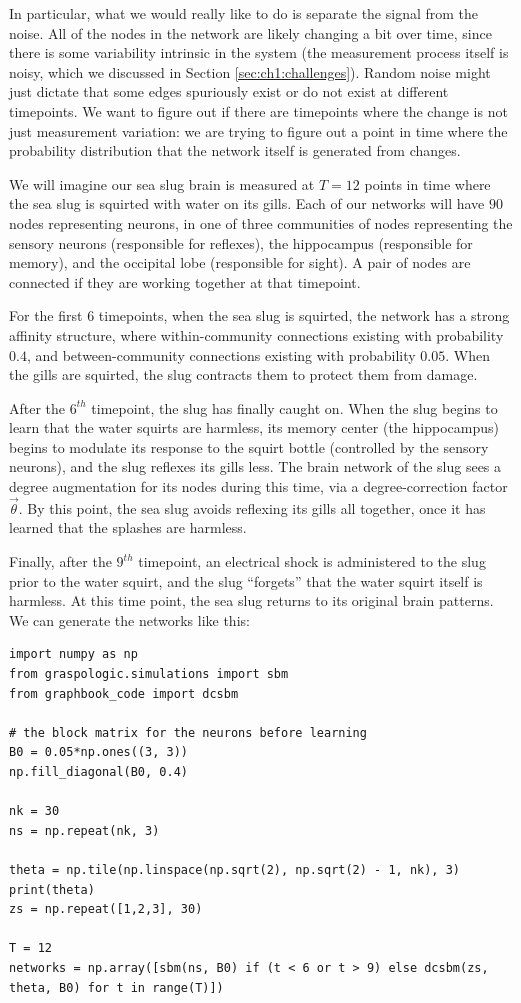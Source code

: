 In particular, what we would really like to do is separate the signal from the noise. All of the nodes in the network are likely changing a bit over time, since there is some variability intrinsic in the system (the measurement process itself is noisy, which we discussed in Section \ref{sec:ch1:challenges}). Random noise might just dictate that some edges spuriously exist or do not exist at different timepoints. We want to figure out if there are timepoints where the change is not just measurement variation: we are trying to figure out a point in time where the probability distribution that the network itself is generated from changes.

We will imagine our sea slug brain is measured at $T=12$ points in time where the sea slug is squirted with water on its gills. Each of our networks will have $90$ nodes representing neurons, in one of three communities of nodes representing the sensory neurons (responsible for reflexes), the hippocampus (responsible for memory), and the occipital lobe (responsible for sight). A pair of nodes are connected if they are working together at that timepoint.

For the first $6$ timepoints, when the sea slug is squirted, the network has a strong affinity structure, where within-community connections existing with probability $0.4$, and between-community connections existing with probability $0.05$. When the gills are squirted, the slug contracts them to protect them from damage.

After the $6^{th}$ timepoint, the slug has finally caught on. When the slug begins to learn that the water squirts are harmless, its memory center (the hippocampus) begins to modulate its response to the squirt bottle (controlled by the sensory neurons), and the slug reflexes its gills less.  The brain network of the slug sees a degree augmentation for its nodes during this time, via a degree-correction factor $\vec\theta$. By this point, the sea slug avoids reflexing its gills all together, once it has learned that the splashes are harmless.

Finally, after the $9^{th}$ timepoint, an electrical shock is administered to the slug prior to the water squirt, and the slug ``forgets'' that the water squirt itself is harmless. At this time point, the sea slug returns to its original brain patterns. We can generate the networks like this:

\begin{lstlisting}[style=python]
import numpy as np
from graspologic.simulations import sbm
from graphbook_code import dcsbm

# the block matrix for the neurons before learning
B0 = 0.05*np.ones((3, 3))
np.fill_diagonal(B0, 0.4)

nk = 30
ns = np.repeat(nk, 3)

theta = np.tile(np.linspace(np.sqrt(2), np.sqrt(2) - 1, nk), 3)
print(theta)
zs = np.repeat([1,2,3], 30)

T = 12
networks = np.array([sbm(ns, B0) if (t < 6 or t > 9) else dcsbm(zs, theta, B0) for t in range(T)])
\end{lstlisting}

